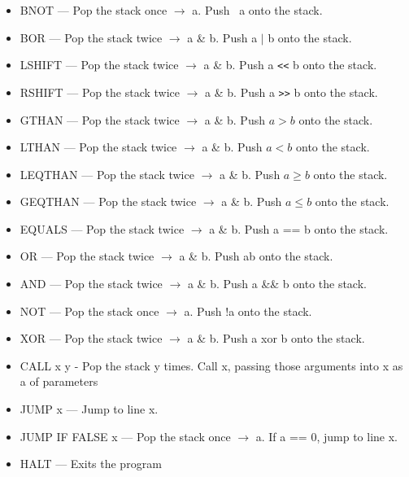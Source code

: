 \documentclass[12pt, letterpaper, oneside]{article}
\begin{document}
\begin{itemize}
		\item BNOT --- Pop the stack once $\rightarrow$ a. Push ~a onto the stack.
		\item BOR --- Pop the stack twice $\rightarrow$ a \& b. Push a $\vert$ b onto the stack.
		\item LSHIFT --- Pop the stack twice $\rightarrow$ a \& b. Push a \verb|<<|  b onto the stack.
		\item RSHIFT --- Pop the stack twice $\rightarrow$ a \& b. Push a \verb|>>| b onto the stack.
		\item GTHAN --- Pop the stack twice $\rightarrow$ a \& b. Push $a>b$ onto the stack.
		\item LTHAN --- Pop the stack twice $\rightarrow$ a \& b. Push $a<b$ onto the stack.
		\item LEQTHAN --- Pop the stack twice $\rightarrow$ a \& b. Push $a\geq b$ onto the stack.
		\item GEQTHAN --- Pop the stack twice $\rightarrow$ a \& b. Push $a\leq b$ onto the stack.
		\item EQUALS --- Pop the stack twice $\rightarrow$ a \& b. Push a == b onto the stack.
		\item OR --- Pop the stack twice $\rightarrow$ a \& b. Push a\textbar\textbar b onto the stack.
		\item AND --- Pop the stack twice $\rightarrow$ a \& b. Push a \&\& b onto the stack.
		\item NOT --- Pop the stack once $\rightarrow$ a. Push !a onto the stack.
		\item XOR --- Pop the stack twice $\rightarrow$ a \& b. Push a xor b onto the stack.
		\item CALL x y - Pop the stack y times. Call x, passing those arguments into x as a of parameters
		\item JUMP x --- Jump to line x.
		\item JUMP IF FALSE x --- Pop the stack once $\rightarrow$ a. If a == 0, jump to line x.
		\item HALT --- Exits the program
	\end{itemize}
	\newpage
	
\end{document}
